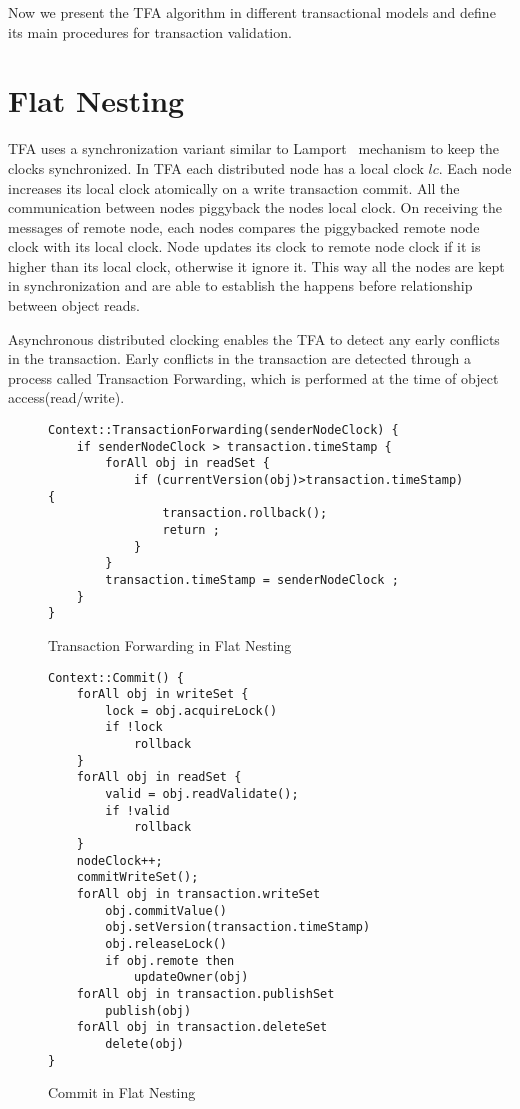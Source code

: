 \documentclass[12pt,english]{report}
\begin{document}
Now we present the TFA algorithm in different transactional models and define its main procedures for transaction validation.
 
\section{Flat Nesting}
TFA uses a synchronization variant similar to Lamport~\cite{lamport1978time} mechanism to keep the clocks synchronized. In TFA each distributed node has a local clock $lc$. Each node increases its local clock atomically on a write transaction commit. All the communication between nodes piggyback the nodes local clock. On receiving the messages of remote node, each nodes compares the piggybacked remote node clock with its local clock. Node updates its clock to remote node clock if it is higher than its local clock, otherwise it ignore it. This way all the nodes are kept in synchronization and are able to establish the happens before relationship between object reads. 

Asynchronous distributed clocking enables the TFA to detect any early conflicts in the transaction. Early conflicts in the transaction are detected through a process called Transaction Forwarding, which is performed at the time of object access(read/write). 

\begin{figure}
\begin{minipage}[b]{0.9\linewidth}\centering
\begin{lstlisting}
Context::TransactionForwarding(senderNodeClock) {
	if senderNodeClock > transaction.timeStamp {
		forAll obj in readSet {
			if (currentVersion(obj)>transaction.timeStamp) { 
				transaction.rollback();
				return ;		
			}
		}
		transaction.timeStamp = senderNodeClock ; 
	}
}
\end{lstlisting}
\end{minipage}
\caption{Transaction Forwarding in Flat Nesting}
\label{Fig:FlatTFA}
\end{figure}

\begin{figure}[H]
\begin{minipage}[b]{0.9\linewidth}\centering
\begin{lstlisting}
Context::Commit() {
	forAll obj in writeSet {
		lock = obj.acquireLock()
		if !lock
			rollback
	}
	forAll obj in readSet {
		valid = obj.readValidate();
		if !valid
			rollback
	}
	nodeClock++;
	commitWriteSet();
	forAll obj in transaction.writeSet
		obj.commitValue()
 		obj.setVersion(transaction.timeStamp)
 		obj.releaseLock()
 		if obj.remote then
 			updateOwner(obj)
	forAll obj in transaction.publishSet
		publish(obj)
	forAll obj in transaction.deleteSet
		delete(obj)
}
\end{lstlisting}
\end{minipage}
\caption{Commit in Flat Nesting}
\label{Fig:FlatCommit}
\end{figure}
\end{document}
